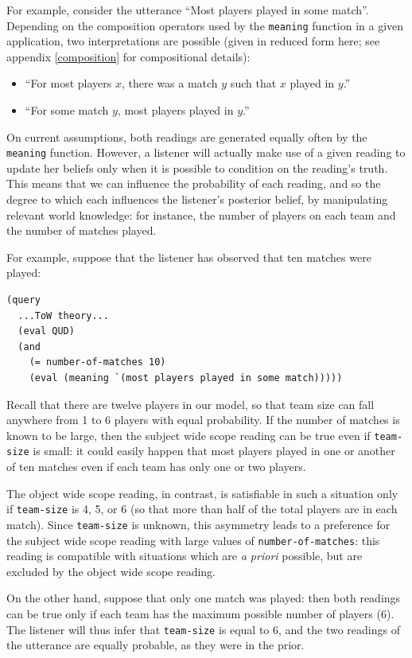 \documentclass[pdfextras]{handbook}
\begin{document}
For example, consider the utterance ``Most players played in some match''. 
Depending on the composition operators used by the \lstinline{meaning} function in a given application, two interpretations are possible (given in reduced form here; see appendix \ref{composition} for compositional details):
\begin{itemize}
\item ``For most players $x$, there was a match $y$ such that $x$ played in $y$.'' 
\item ``For some match $y$, most players played in $y$.''
\end{itemize}
On current assumptions, both readings are generated equally often by the \lstinline{meaning} function. 
However, a listener will actually make use of a given reading to update her beliefs only when it is possible to condition on the reading's truth. 
This means that we can influence the probability of each reading, and so the degree to which each influences the listener's posterior belief, by manipulating relevant world knowledge: for instance, the number of players on each team and the number of matches played.

For example, suppose that the listener has observed that ten matches were played:
\begin{lstlisting}
(query
  ...ToW theory...
  (eval QUD)
  (and 
    (= number-of-matches 10)
    (eval (meaning `(most players played in some match)))))
\end{lstlisting}
Recall that there are twelve players in our model, so that team size can fall anywhere from 1 to 6 players with equal probability. 
If the number of matches is known to be large, then the subject wide scope reading can be true even if \lstinline{team-size} is small: it could easily happen that most players played in one or another of ten matches even if each team has only one or two players. 

The object wide scope reading, in contrast, is satisfiable in such a situation only if \lstinline{team-size} is 4, 5, or 6 (so that more than half of the total players are in each match). 
Since \lstinline{team-size} is unknown, this asymmetry leads to a preference for the subject wide scope reading with large values of \lstinline{number-of-matches}: this reading is compatible with situations which are \emph{a priori} possible, but are excluded by the object wide scope reading. 

On the other hand, suppose that only one match was played: then both readings can be true only if each team has the maximum possible number of players (6). 
The listener will thus infer that \lstinline{team-size} is equal to 6, and the two readings of the utterance are equally probable, as they were in the prior.
\end{document}
